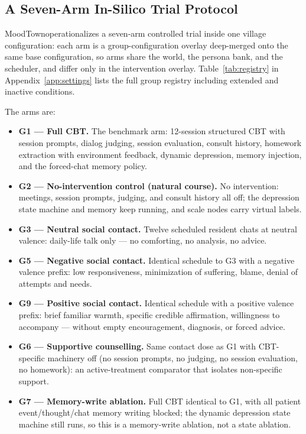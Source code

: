 \documentclass[10pt]{article}
\newcommand{\sys}{MoodTown}
\begin{document}
\subsection{A Seven-Arm In-Silico Trial Protocol}\label{sec:arms}

\sys operationalizes a seven-arm controlled trial inside one village configuration: each arm is a group-configuration overlay deep-merged onto the same base configuration, so arms share the world, the persona bank, and the scheduler, and differ only in the intervention overlay.
Table~\ref{tab:registry} in Appendix~\ref{app:settings} lists the full group registry including extended and inactive conditions.

The arms are:
\begin{itemize}
\item \textbf{G1 --- Full CBT.} The benchmark arm: 12-session structured CBT with session prompts, dialog judging, session evaluation, consult history, homework extraction with environment feedback, dynamic depression, memory injection, and the forced-chat memory policy.
\item \textbf{G2 --- No-intervention control (natural course).} No intervention: meetings, session prompts, judging, and consult history all off; the depression state machine and memory keep running, and scale nodes carry virtual labels.
\item \textbf{G3 --- Neutral social contact.} Twelve scheduled resident chats at neutral valence: daily-life talk only --- no comforting, no analysis, no advice.
\item \textbf{G5 --- Negative social contact.} Identical schedule to G3 with a negative valence prefix: low responsiveness, minimization of suffering, blame, denial of attempts and needs.
\item \textbf{G9 --- Positive social contact.} Identical schedule with a positive valence prefix: brief familiar warmth, specific credible affirmation, willingness to accompany --- without empty encouragement, diagnosis, or forced advice.
\item \textbf{G6 --- Supportive counselling.} Same contact dose as G1 with CBT-specific machinery off (no session prompts, no judging, no session evaluation, no homework): an active-treatment comparator that isolates non-specific support.
\item \textbf{G7 --- Memory-write ablation.} Full CBT identical to G1, with all patient event/thought/chat memory writing blocked; the dynamic depression state machine still runs, so this is a memory-write ablation, not a state ablation.
\end{itemize}
\end{document}
